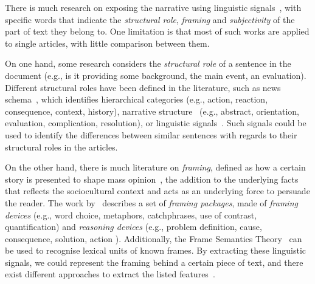 There is much research on exposing the narrative using linguistic signals~\cite{zahid2019towards}, with specific words that indicate the \emph{structural role}, \emph{framing} and \emph{subjectivity} of the part of text they belong to.
One limitation is that most of such works are applied to single articles, with little comparison between them.

On one hand, some research considers the \emph{structural role} of a sentence in the document (e.g., is it providing some background, the main event, an evaluation).
Different structural roles have been defined in the literature, such as 
news schema~\cite{bell1991language}, which identifies hierarchical categories (e.g., action, reaction, consequence, context, history), narrative structure~\cite{bell2005news} (e.g., abstract, orientation, evaluation, complication, resolution), or linguistic signals~\cite{zahid2019towards,marcu2000theory}. 
Such signals could be used to identify the differences between similar sentences with regards to their structural roles in the articles. 

On the other hand, there is much literature on \emph{framing}, defined
as how a certain story is presented to shape mass opinion~\cite{goffman1974frame}, the addition to the underlying facts that reflects the sociocultural context
and acts as an underlying force to persuade the reader.
The work by~\cite{gamson1989media} describes a set of \emph{framing packages}, made of \emph{framing devices} (e.g., word choice, metaphors, catchphrases, 
use of contrast, quantification) and \emph{reasoning devices} (e.g., problem definition, cause, consequence, solution, action%
).
Additionally, the Frame Semantics Theory~\cite{fillmore2006frame} can be used to recognise lexical units of known frames.
By extracting these linguistic signals, we could represent the framing behind a certain piece of text, and there exist different approaches to extract the listed features~\cite{mandal2017overview,gao2018neural,asghar2016automatic,swayamdipta:17}.

